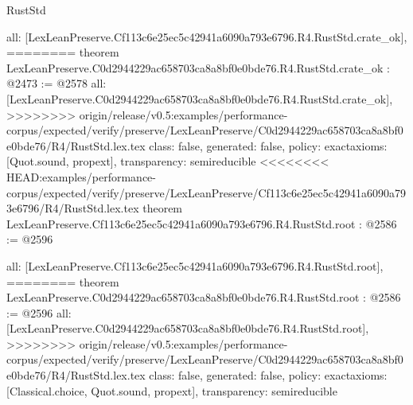 \begin{lexlean}{RustStd}
\begin{coremodule}
{\begin{coremodule}
{{{{{{  all: [LexLeanPreserve.Cf113c6e25ec5c42941a6090a793e6796.R4.RustStd.crate_ok],
========
theorem LexLeanPreserve.C0d2944229ac658703ca8a8bf0e0bde76.R4.RustStd.crate_ok : @2473 := @2578 {
  all: [LexLeanPreserve.C0d2944229ac658703ca8a8bf0e0bde76.R4.RustStd.crate_ok],
>>>>>>>> origin/release/v0.5:examples/performance-corpus/expected/verify/preserve/LexLeanPreserve/C0d2944229ac658703ca8a8bf0e0bde76/R4/RustStd.lex.tex
  class: false,
  generated: false,
  policy: exact{axioms: [Quot.sound, propext]},
  transparency: semireducible
}
<<<<<<<< HEAD:examples/performance-corpus/expected/verify/preserve/LexLeanPreserve/Cf113c6e25ec5c42941a6090a793e6796/R4/RustStd.lex.tex
theorem LexLeanPreserve.Cf113c6e25ec5c42941a6090a793e6796.R4.RustStd.root : @2586 := @2596 {
  all: [LexLeanPreserve.Cf113c6e25ec5c42941a6090a793e6796.R4.RustStd.root],
========
theorem LexLeanPreserve.C0d2944229ac658703ca8a8bf0e0bde76.R4.RustStd.root : @2586 := @2596 {
  all: [LexLeanPreserve.C0d2944229ac658703ca8a8bf0e0bde76.R4.RustStd.root],
>>>>>>>> origin/release/v0.5:examples/performance-corpus/expected/verify/preserve/LexLeanPreserve/C0d2944229ac658703ca8a8bf0e0bde76/R4/RustStd.lex.tex
  class: false,
  generated: false,
  policy: exact{axioms: [Classical.choice, Quot.sound, propext]},
  transparency: semireducible
}

}}}}}}}
\end{coremodule}}
\end{coremodule}
\end{lexlean}

